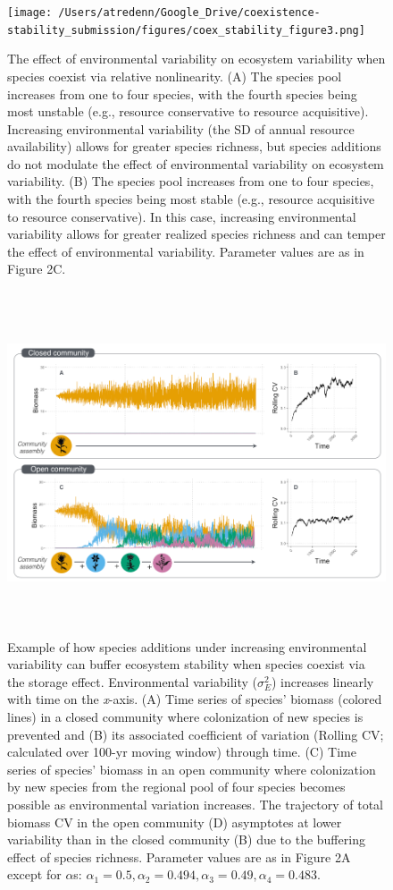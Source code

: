 \documentclass[12pt,]{article}
\begin{document}
\newpage{}

\begin{figure}[!ht]
  \centering
      \texttt{[image: /Users/atredenn/Google\_Drive/coexistence-stability\_submission/figures/coex\_stability\_figure3.png]}
  \caption{The effect of environmental variability on ecosystem variability when species coexist via relative nonlinearity. (A) The species pool increases from one to four species, with the fourth species being most unstable (e.g., resource conservative to resource acquisitive). Increasing environmental variability (the SD of annual resource availability) allows for greater species richness, but species additions do not modulate the effect of environmental variability on ecosystem variability. (B) The species pool increases from one to four species, with the fourth species being most stable (e.g., resource acquisitive to resource conservative). In this case, increasing environmental variability allows for greater realized species richness and can temper the effect of environmental variability. Parameter values are as in Figure 2C.}
\end{figure}

\newpage{}

\begin{figure}[!ht]
  \centering
      \includegraphics[height=4in]{./components/coexistence_stability_infographic_v2.png}
  \caption{Example of how species additions under increasing environmental variability can buffer ecosystem stability when species coexist via the storage effect. Environmental variability ($\sigma^2_E$) increases linearly with time on the \emph{x}-axis. (A) Time series of species' biomass (colored lines) in a closed community where colonization of new species is prevented and (B) its associated coefficient of variation (Rolling CV; calculated over 100-yr moving window) through time. (C) Time series of species' biomass in an open community where colonization by new species from the regional pool of four species becomes possible as environmental variation increases. The trajectory of total biomass CV in the open community (D) asymptotes at lower variability than in the closed community (B) due to the buffering effect of species richness. Parameter values are as in Figure 2A except for $\alpha$s: $\alpha_1 = 0.5, \alpha_2 = 0.494, \alpha_3 = 0.49, \alpha_4 = 0.483$.}
\end{figure}
\end{document}
